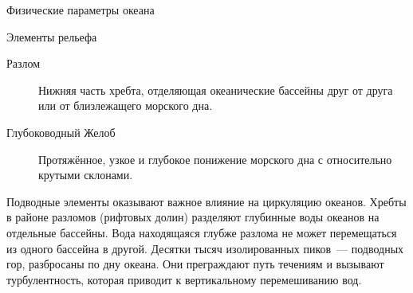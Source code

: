 \begin{chapter}{Физические параметры океана}
\begin{section}{Элементы рельефа}
\begin{description}
\item[Разлом]
Нижняя часть хребта, отделяющая океанические бассейны друг от друга
или от близлежащего морского дна.
%

\item[Глубоководный Желоб]
Протяжённое, узкое и глубокое понижение морского дна с относительно
крутыми склонами.
%
\end{description}

Подводные элементы оказывают важное влияние на циркуляцию
океанов. Хребты в районе разломов (рифтовых долин) разделяют глубинные
воды океанов на отдельные бассейны. Вода находящаяся глубже разлома не
может перемещаться из одного бассейна в другой. Десятки тысяч
изолированных пиков~--- подводных гор, разбросаны по дну океана. Они
преграждают путь течениям и вызывают турбулентность, которая приводит
к вертикальному перемешиванию вод.
%



\end{section}


\end{chapter}
